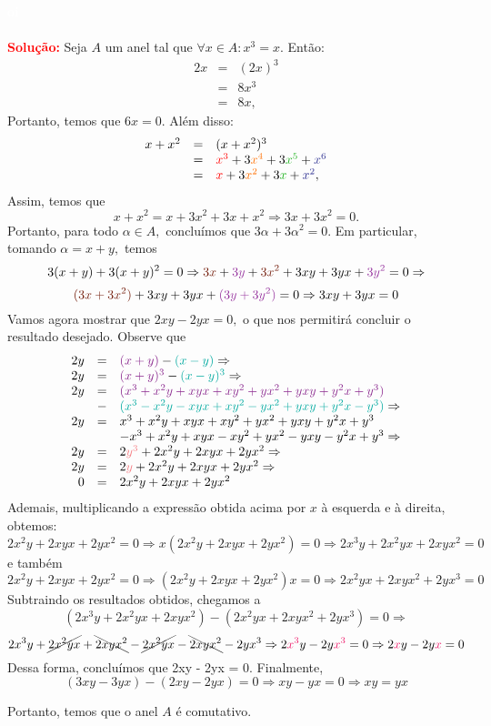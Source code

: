 \documentclass[11pt,a4paper]{article}
\newcommand{\solucao}[1]{
\textbf{\textcolor{white}{oi}\\ \\ \textcolor{red}{Solução:}} #1}
\begin{document}
\solucao{
Seja $A$ um anel tal que $\forall x\in A:x^3=x$. Então:
\[
\begin{array}{rcl}
2x&=&(2x)^3\\&=&8x^3\\&=&8x,
\end{array}
\]
Portanto, temos que $6x = 0.$ Além disso:
\[
\begin{array}{rcl}
x+x^2&=&(x+x^2)^3\\&=&\textcolor{red}{x^3}+3\textcolor{Laranja}{x^4}+3\textcolor{Verde}{x^5}+\textcolor{Blue}{x^6}\\&=&\textcolor{red}{x}+3\textcolor{Laranja}{x^2}+3\textcolor{Verde}{x}+\textcolor{Blue}{x^2},
\end{array}
\]
Assim, temos que
\[
x + x^2 = x + 3x^2 + 3x + x^2 \Rightarrow 3x+3x^2=0.
\]
Portanto, para todo $\alpha \in A,$ concluímos que $3\alpha + 3\alpha^2 = 0.$ Em particular, tomando $\alpha = x + y,$ temos
\[
3(x+y) + 3(x+y)^2 = 0 \Rightarrow \textcolor{Brown}{3x}+\textcolor{Purple}{3y}+\textcolor{Brown}{3x^2} + 3xy + 3yx + \textcolor{Purple}{3y^2} = 0 \Rightarrow\]\[ \textcolor{Brown}{(3x + 3x^2)} + 3xy + 3yx + \textcolor{Purple}{(3y + 3y^2)} = 0 \Rightarrow 3xy + 3yx = 0
\]
Vamos agora mostrar que $2xy - 2yx = 0,$ o que nos permitirá concluir o resultado desejado. Observe que
\[
\begin{array}{rcl}
2y &=& \textcolor{Fuchsia}{(x+y)} - \textcolor{Emerald}{(x-y)} \Rightarrow \\
2y &=& \textcolor{Fuchsia}{(x+y)^3} - \textcolor{Emerald}{(x-y)^3} \Rightarrow\\
2y &=&\textcolor{Fuchsia}{(x^3 + x^2y+xyx + xy^2 + yx^2 + yxy + y^2 x + y^3)} \\&-& \textcolor{Emerald}{(x^3 - x^2y-xyx + xy^2 - yx^2 + yxy + y^2 x - y^3)} \Rightarrow \\
2y &=& x^3 + x^2y+xyx + xy^2 + yx^2 + yxy + y^2 x + y^3 \\&&-x^3 + x^2y+xyx - xy^2 + yx^2 - yxy - y^2 x + y^3  \Rightarrow \\2y &=& 2\textcolor{Salmon}{y^3}+2x^2y+2xyx+2yx^2 \Rightarrow
\\
2y &=& 2\textcolor{Salmon}{y}+2x^2y+2xyx+2yx^2 \Rightarrow
\\
0&=&2x^2y+2xyx+2yx^2
\end{array}
\]
Ademais, multiplicando a expressão obtida acima por $x$ à esquerda e à direita, obtemos: 
\[
2x^2y+2xyx+2yx^2=0 \Rightarrow x(2x^2y+2xyx+2yx^2) = 0 \Rightarrow 2x^3y+2x^2yx+2xyx^2=0
\]
e também
\[
2x^2y+2xyx+2yx^2=0 \Rightarrow (2x^2y+2xyx+2yx^2)x = 0 \Rightarrow 2x^2yx +2xyx^2 + 2yx^3 = 0
\]
Subtraindo os resultados obtidos, chegamos a
\[
(2x^3y+2x^2yx+2xyx^2) - (2x^2yx +2xyx^2 + 2yx^3 ) = 0 \Rightarrow \]\[ 2x^3y+ \cancel{2x^2yx}+\bcancel{2xyx^2} - \cancel{2x^2yx} - \bcancel{2xyx^2} - 2yx^3 \Rightarrow 2\textcolor{WildStrawberry}{x^3}y-2y\textcolor{WildStrawberry}{x^3}=0 \Rightarrow 2\textcolor{WildStrawberry}{x}y-2y\textcolor{WildStrawberry}{x}=0
\]
Dessa forma, concluímos que 2xy - 2yx = 0. Finalmente, 
\[
(3xy - 3yx) - (2xy - 2yx) = 0 \Rightarrow xy - yx = 0 \Rightarrow \boxed{xy = yx}
\]

Portanto, temos que o anel $A$ é comutativo.
}
\end{document}
